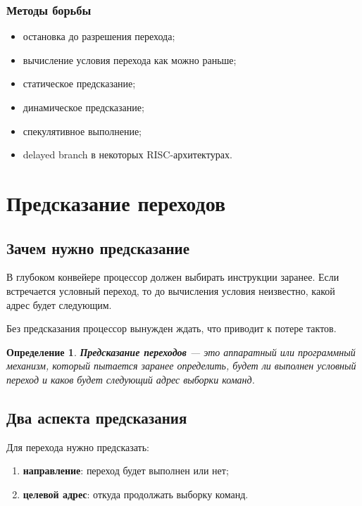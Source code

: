 \documentclass[12pt,a4paper]{article}
\newtheorem{definition}{Определение}
\begin{document}
\subsubsection{Методы борьбы}

\begin{itemize}
    \item остановка до разрешения перехода;
    \item вычисление условия перехода как можно раньше;
    \item статическое предсказание;
    \item динамическое предсказание;
    \item спекулятивное выполнение;
    \item delayed branch в некоторых RISC-архитектурах.
\end{itemize}

\section{Предсказание переходов}

\subsection{Зачем нужно предсказание}

В глубоком конвейере процессор должен выбирать инструкции заранее. Если встречается условный переход, то до вычисления условия неизвестно, какой адрес будет следующим.

Без предсказания процессор вынужден ждать, что приводит к потере тактов.

\begin{definition}
\textbf{Предсказание переходов} --- это аппаратный или программный механизм, который пытается заранее определить, будет ли выполнен условный переход и каков будет следующий адрес выборки команд.
\end{definition}

\subsection{Два аспекта предсказания}

Для перехода нужно предсказать:

\begin{enumerate}
    \item \textbf{направление}: переход будет выполнен или нет;
    \item \textbf{целевой адрес}: откуда продолжать выборку команд.
\end{enumerate}
\end{document}
